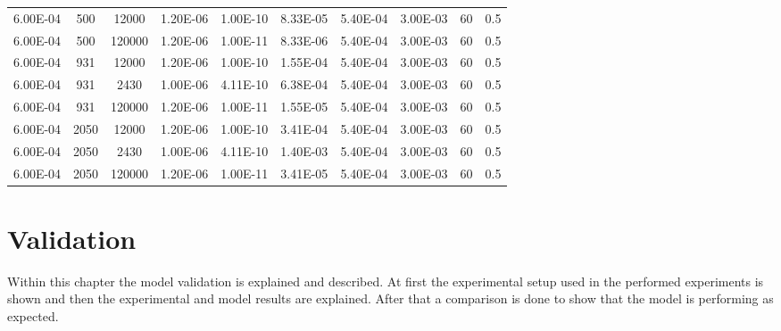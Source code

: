 \documentclass[../thesis.tex]{subfiles}
\begin{document}
\begin{landscape}
\begin{table}[htb]
\begin{tabular}{cccccccccc}
			6.00E-04            & 500         & 12000       & 1.20E-06               & 1.00E-10               & 8.33E-05              & 5.40E-04      & 3.00E-03        & 60                            & 0.5                       \\
			6.00E-04            & 500         & 120000      & 1.20E-06               & 1.00E-11               & 8.33E-06              & 5.40E-04      & 3.00E-03        & 60                            & 0.5                       \\
			6.00E-04            & 931         & 12000       & 1.20E-06               & 1.00E-10               & 1.55E-04              & 5.40E-04      & 3.00E-03        & 60                            & 0.5                       \\
			6.00E-04            & 931         & 2430        & 1.00E-06               & 4.11E-10               & 6.38E-04              & 5.40E-04      & 3.00E-03        & 60                            & 0.5                       \\
			6.00E-04            & 931         & 120000      & 1.20E-06               & 1.00E-11               & 1.55E-05              & 5.40E-04      & 3.00E-03        & 60                            & 0.5                       \\
			6.00E-04            & 2050        & 12000       & 1.20E-06               & 1.00E-10               & 3.41E-04              & 5.40E-04      & 3.00E-03        & 60                            & 0.5                       \\
			6.00E-04            & 2050        & 2430        & 1.00E-06               & 4.11E-10               & 1.40E-03              & 5.40E-04      & 3.00E-03        & 60                            & 0.5                       \\
			6.00E-04            & 2050        & 120000      & 1.20E-06               & 1.00E-11               & 3.41E-05              & 5.40E-04      & 3.00E-03        & 60                            & 0.5						\\
			\hline      
		\end{tabular}
	\end{table}
\end{landscape}

\section{Validation}
\label{chp:validation}
Within this chapter the model validation is explained and described. At first the experimental setup used in the performed experiments is shown and then the experimental and model results are explained. After that a comparison is done to show that the model is performing as expected.
\end{document}
